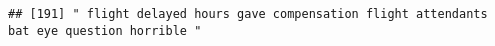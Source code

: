\documentclass[
]{article}
\begin{document}
\begin{verbatim}
## [191] " flight delayed hours gave compensation flight attendants bat eye question horrible "                                                                                                                                                                                                                                                                                                                                                                                                                                                                                                                                                                                                                                                                                                                                                                                                                                                                                                                                                                                                                                                                                                                                                                                                                                                                                                                                                                                                                                                                                                                                                                                                                                                                                                          

\end{verbatim}
\end{document}
